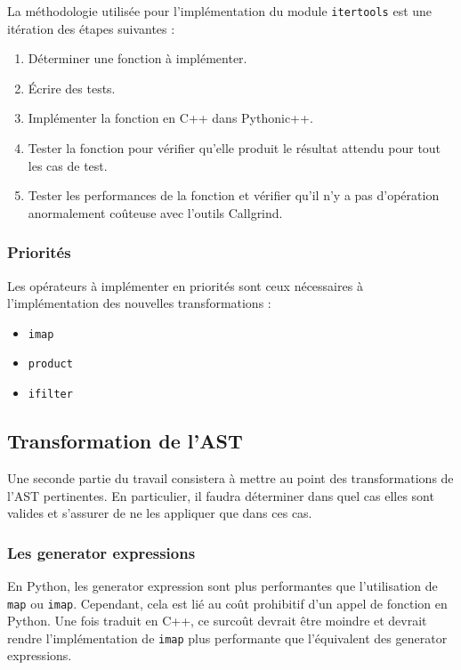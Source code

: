 \documentclass[a4paper]{article}
\begin{document}
La méthodologie utilisée pour l'implémentation du module \texttt{itertools} est
une itération des étapes suivantes :

\begin{enumerate}
\item Déterminer une fonction à implémenter.
\item Écrire des tests.
\item Implémenter la fonction en C++ dans Pythonic++.
\item Tester la fonction pour vérifier qu'elle produit le résultat
    attendu pour tout les cas de test.
\item Tester les performances de la fonction et vérifier qu'il n'y a
    pas d'opération anormalement coûteuse avec l'outils Callgrind.
\end{enumerate}

\subsubsection{Priorités}

Les opérateurs à implémenter en priorités sont ceux nécessaires à
l'implémentation des nouvelles transformations :

\begin{itemize}
  \item \texttt{imap}
  \item \texttt{product}
  \item \texttt{ifilter}
\end{itemize}


\subsection{Transformation de l'AST}

Une seconde partie du travail consistera à mettre au point des
transformations de l'AST pertinentes. En particulier, il faudra
déterminer dans quel cas elles sont valides et s'assurer de ne les
appliquer que dans ces cas.

\subsubsection{Les generator expressions}

En Python, les generator expression sont plus performantes que
l'utilisation de \texttt{map} ou \texttt{imap}. Cependant, cela est lié au coût
prohibitif d'un appel de fonction en Python. Une fois traduit en C++,
ce surcoût devrait être moindre et devrait rendre l'implémentation de
\texttt{imap} plus performante que l'équivalent des generator expressions.
\end{document}
